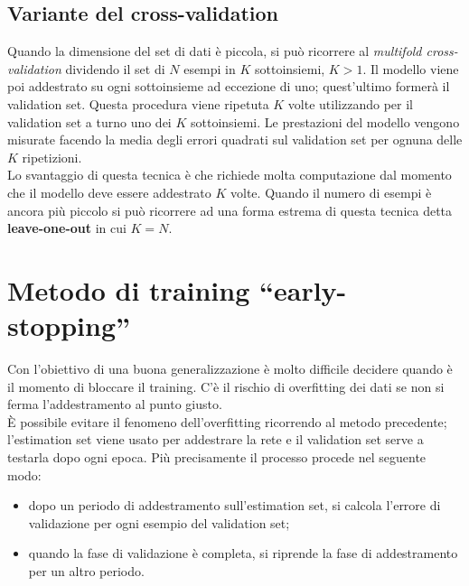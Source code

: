 \subsection{Variante del cross-validation} %
\label{sub:variante_del_cross_validation}
Quando la dimensione del set di dati è piccola, si può ricorrere al \emph{multifold cross-validation} dividendo il set di $N$ esempi in $K$ sottoinsiemi, $K>1$. Il modello viene poi addestrato su ogni sottoinsieme ad eccezione di uno; quest'ultimo formerà il validation set. Questa procedura viene ripetuta $K$ volte utilizzando per il validation set a turno uno dei $K$ sottoinsiemi. Le prestazioni del modello vengono misurate facendo la media degli errori quadrati sul validation set per ognuna delle $K$ ripetizioni.\\
Lo svantaggio di questa tecnica è che richiede molta computazione dal momento che il modello deve essere addestrato $K$ volte.
Quando il numero di esempi è ancora più piccolo si può ricorrere ad una forma estrema di questa tecnica detta \textbf{leave-one-out} in cui $K=N$.

\newpage

\section{Metodo di training “early-stopping”} %
\label{sec:metodo_di_training_early_stopping_}
Con l’obiettivo di una buona generalizzazione è molto difficile decidere quando è il momento di bloccare il training. C'è il rischio di overfitting dei dati se non si ferma l'addestramento al punto giusto.\\
È possibile evitare il fenomeno dell'overfitting ricorrendo al metodo precedente; l'estimation set viene usato per addestrare la rete e il validation set serve a testarla dopo ogni epoca. Più precisamente il processo procede nel seguente modo:
\begin{itemize}
    \item dopo un periodo di addestramento sull'estimation set, si calcola l'errore di validazione per ogni esempio del validation set;
    \item quando la fase di validazione è completa, si riprende la fase di addestramento per un altro periodo.
\end{itemize}

